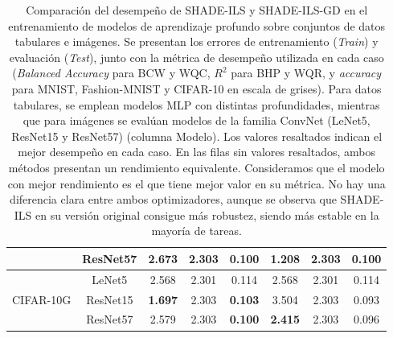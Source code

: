\begin{table}[tbp]
{\begin{tabular}{|c|c|ccc|ccc|}
                                   & ResNet57                         & \multicolumn{1}{c|}{2.673}          & \multicolumn{1}{c|}{2.303}          & 0.100                  & \multicolumn{1}{c|}{\textbf{1.208}}  & \multicolumn{1}{c|}{2.303}           & 0.100                           \\ \hline
\multirow{3}{*}{CIFAR-10G}        & LeNet5                           & \multicolumn{1}{c|}{2.568}          & \multicolumn{1}{c|}{2.301}          & 0.114                  & \multicolumn{1}{c|}{2.568}           & \multicolumn{1}{c|}{2.301}           & 0.114                           \\ \cline{2-8} 
                                   & ResNet15                         & \multicolumn{1}{c|}{\textbf{1.697}} & \multicolumn{1}{c|}{2.303}          & \textbf{0.103}         & \multicolumn{1}{c|}{3.504}           & \multicolumn{1}{c|}{2.303}           & 0.093                           \\ \cline{2-8} 
                                   & ResNet57                         & \multicolumn{1}{c|}{2.579}          & \multicolumn{1}{c|}{2.303}          & \textbf{0.100}         & \multicolumn{1}{c|}{\textbf{2.415}}  & \multicolumn{1}{c|}{2.303}           & 0.096                           \\ \hline
\end{tabular}}
\caption[Comparación del desempeño de SHADE-ILS y SHADE-ILS-GD en el entrenamiento de modelos de aprendizaje profundo sobre conjuntos de datos tabulares e imágenes]{Comparación del desempeño de SHADE-ILS y SHADE-ILS-GD en el entrenamiento de modelos de aprendizaje profundo sobre conjuntos de datos tabulares e imágenes. Se presentan los errores de entrenamiento (\textit{Train}) y evaluación (\textit{Test}), junto con la métrica de desempeño utilizada en cada caso (\textit{Balanced Accuracy} para BCW y WQC, $R^2$  para BHP y WQR, y \textit{accuracy} para MNIST, Fashion-MNIST y CIFAR-10 en escala de grises). Para datos tabulares, se emplean modelos MLP con distintas profundidades, mientras que para imágenes se evalúan modelos de la familia ConvNet (LeNet5, ResNet15 y ResNet57)  (columna Modelo). Los valores resaltados indican el mejor desempeño en cada caso. En las filas sin valores resaltados, ambos métodos presentan un rendimiento equivalente. Consideramos que el modelo con mejor rendimiento es el que tiene mejor valor en su métrica. No hay una diferencia clara entre ambos optimizadores, aunque se observa que SHADE-ILS en su versión original consigue más robustez, siendo más estable en la mayoría de tareas.}
\label{tab:ilsvsilsgd}
\end{table}


